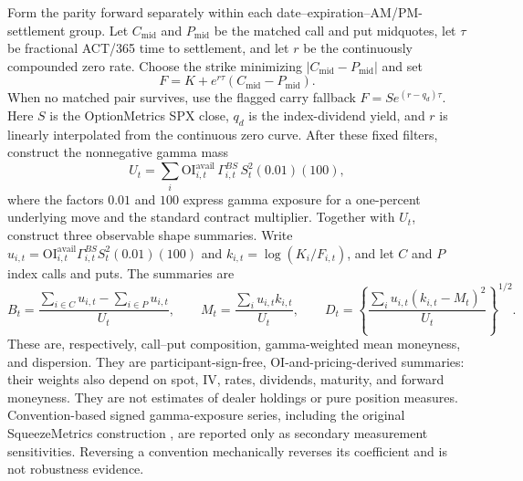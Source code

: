 \documentclass[11pt]{article}
\begin{document}
Form the parity forward separately within each date--expiration--AM/PM-settlement group.
Let $C_{\mathrm{mid}}$ and $P_{\mathrm{mid}}$ be the matched call and put midquotes, let
$\tau$ be fractional ACT/365 time to settlement, and let $r$ be the continuously compounded
zero rate.  Choose the strike minimizing $|C_{\mathrm{mid}}-P_{\mathrm{mid}}|$ and set
\[
F=K+e^{r\tau}(C_{\mathrm{mid}}-P_{\mathrm{mid}}).
\]
When no matched pair survives, use the flagged carry fallback
$F=S e^{(r-q_d)\tau}$.  Here $S$ is the OptionMetrics SPX close, $q_d$ is the
index-dividend yield, and $r$ is linearly interpolated from the continuous zero curve.
After these fixed filters, construct the nonnegative gamma mass
\begin{equation}
U_t=\sum_i \mathrm{OI}^{\mathrm{avail}}_{i,t}\,
\Gamma_{i,t}^{BS}\,S_t^2(0.01)(100),
\label{eq:unsigned-gamma}
\end{equation}
where the factors $0.01$ and $100$ express gamma exposure for a one-percent underlying move
and the standard contract multiplier.  Together with $U_t$, construct three observable
shape summaries.  Write
$u_{i,t}=\mathrm{OI}^{\mathrm{avail}}_{i,t}\Gamma_{i,t}^{BS}S_t^2(0.01)(100)$ and
$k_{i,t}=\log(K_i/F_{i,t})$, and let $C$ and $P$ index calls and puts.  The summaries are
\begin{equation}
B_t=\frac{\sum_{i\in C}u_{i,t}-\sum_{i\in P}u_{i,t}}{U_t},\qquad
M_t=\frac{\sum_i u_{i,t}k_{i,t}}{U_t},\qquad
D_t=\left\{\frac{\sum_i u_{i,t}(k_{i,t}-M_t)^2}{U_t}\right\}^{1/2}.
\label{eq:book-summaries}
\end{equation}
These are, respectively, call--put composition, gamma-weighted mean moneyness, and
dispersion.  They are participant-sign-free, OI-and-pricing-derived summaries: their weights
also depend on spot, IV, rates, dividends, maturity, and forward moneyness.  They are not
estimates of dealer holdings or pure position measures.  Convention-based signed
gamma-exposure series, including the original SqueezeMetrics
construction \citep{squeezemetrics2017}, are reported only as secondary measurement
sensitivities.  Reversing a convention mechanically reverses its coefficient and is not
robustness evidence.
\end{document}
